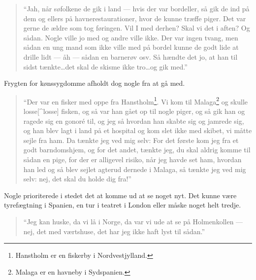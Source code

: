 \begin{quote}
``Jah, når søfolkene de gik i land --- hvis der var bordeller, så gik de
ind på dem og ellers på havnerestaurationer, hvor de kunne træffe piger.
Det var gerne de ældre som tog føringen. Vil I med derhen? Skal vi det i
aften? Og sådan. Nogle ville jo med og andre ville ikke. Der var ingen
tvang, men sådan en ung mand som ikke ville med på bordel kunne de godt
lide at drille lidt --- åh --- sådan en barnerøv osv. Så hændte det jo,
at han til sidst tænkte\ldots det skal de skisme ikke tro\ldots og gik
med.''
\end{quote}

Frygten for kønssygdomme afholdt dog nogle fra at gå med.

\begin{quote}
``Der var en fisker med oppe fra Hanstholm\footnote{Hanstholm er en
  fiskerby i Nordvestjylland.}. Vi kom til Malaga\footnote{Malaga er en
  havneby i Sydspanien.} og skulle losse{[}\^{}losse{]} fisken, og så
var han gået op til nogle piger, og så gik han og ragede sig en gonoré
til, og jeg så hvordan han skabte sig og jamrede sig, og han blev lagt i
land på et hospital og kom slet ikke med skibet, vi måtte sejle fra ham.
Da tænkte jeg ved mig selv: For det første kom jeg fra et godt
barndomshjem, og for det andet, tænkte jeg, du skal aldrig komme til
sådan en pige, for der er alligevel risiko, når jeg havde set ham,
hvordan han led og så blev sejlet agterud dernede i Malaga, så tænkte
jeg ved mig selv: nej, det skal du holde dig fra!''
\end{quote}

Nogle prioriterede i stedet det at komme ud at se noget nyt. Det kunne
være tyrefægtning i Spanien, en tur i teatret i London eller måske noget
helt tredje.

\begin{quote}
``Jeg kan huske, da vi lå i Norge, da var vi ude at se på Holmenkollen
--- nej, det med værtshuse, det har jeg ikke haft lyst til sådan.''
\end{quote}
